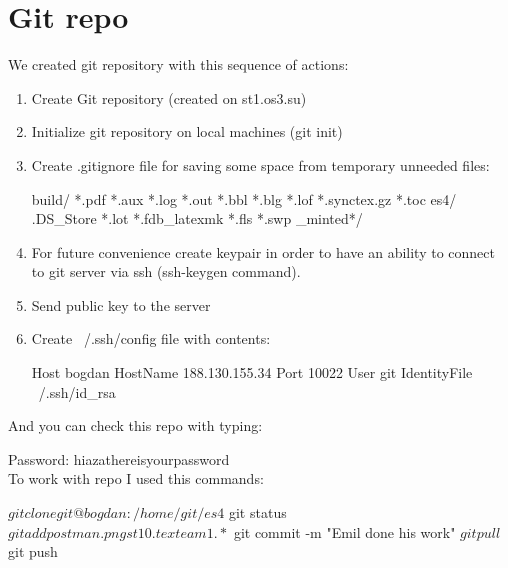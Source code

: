 \documentclass[a4paper,11pt]{article}
\begin{document}
\section{Git repo}
We created git repository with this sequence of actions:

\begin{enumerate}
    \item Create Git repository (created on st1.os3.su)
    \item Initialize git repository on local machines (git init)
    \item Create .gitignore file for saving some space from temporary unneeded files:
    \begin{bashcode}
    build/
    *.pdf
    *.aux
    *.log
    *.out
    *.bbl
    *.blg
    *.lof
    *.synctex.gz
    *.toc
    es4/
    .DS_Store
    *.lot
    *.fdb_latexmk
    *.fls
    *.swp
    _minted*/
    \end{bashcode}
    \item For future convenience create keypair in order to have an ability to connect to git server via ssh (ssh-keygen command).
    \item Send public key to the server 
    \item Create ~/.ssh/config file with contents:
    \begin{bashcode}
    Host bogdan
     HostName 188.130.155.34
     Port 10022
     User git
     IdentityFile ~/.ssh/id_rsa
    \end{bashcode}
    
\end{enumerate}

And you can check this repo with typing:

Password: hiazathereisyourpassword\\

To work with repo I used this commands:

\begin{bashcode}
$ git clone git@bogdan:/home/git/es4
$ git status
$ git add postman.png st10.tex team1.*
$ git commit -m "Emil done his work"
$ git pull
$ git push
\end{bashcode}
\end{document}
